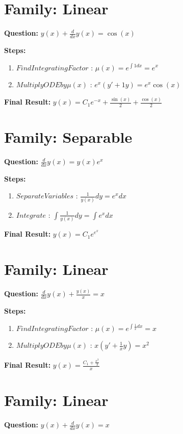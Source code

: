 \documentclass{article}
\begin{document}
\section*{Family: Linear}
\textbf{Question:} $y{\left(x \right)} + \frac{d}{d x} y{\left(x \right)} = \cos{\left(x \right)}$

\textbf{Steps:}
\begin{enumerate}
\item $Find Integrating Factor$ :  $\mu(x) = e^{\int 1 dx} = e^{x}$
\item $Multiply ODE by \mu(x)$ :  $e^{x}(y' + 1y) = e^{x} \cos{\left(x \right)}$
\end{enumerate}
\textbf{Final Result:} $y{\left(x \right)} = C_{1} e^{- x} + \frac{\sin{\left(x \right)}}{2} + \frac{\cos{\left(x \right)}}{2}$

\section*{Family: Separable}
\textbf{Question:} $\frac{d}{d x} y{\left(x \right)} = y{\left(x \right)} e^{x}$

\textbf{Steps:}
\begin{enumerate}
\item $Separate Variables$ :  $\frac{1}{y{\left(x \right)}} dy = e^{x} dx$
\item $Integrate$ :  $\int \frac{1}{y{\left(x \right)}} dy = \int e^{x} dx$
\end{enumerate}
\textbf{Final Result:} $y{\left(x \right)} = C_{1} e^{e^{x}}$

\section*{Family: Linear}
\textbf{Question:} $\frac{d}{d x} y{\left(x \right)} + \frac{y{\left(x \right)}}{x} = x$

\textbf{Steps:}
\begin{enumerate}
\item $Find Integrating Factor$ :  $\mu(x) = e^{\int \frac{1}{x} dx} = x$
\item $Multiply ODE by \mu(x)$ :  $x(y' + \frac{1}{x}y) = x^{2}$
\end{enumerate}
\textbf{Final Result:} $y{\left(x \right)} = \frac{C_{1} + \frac{x^{3}}{3}}{x}$

\section*{Family: Linear}
\textbf{Question:} $y{\left(x \right)} + \frac{d}{d x} y{\left(x \right)} = x$
\end{document}
